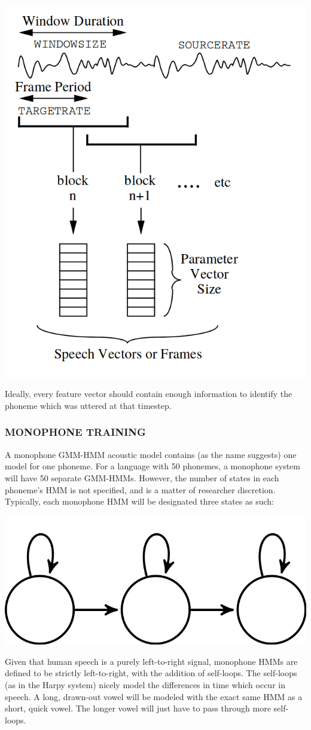\documentclass[10pt,a4paper]{article}
\begin{document}
  
\begin{center}
\includegraphics[width=.45\textwidth,keepaspectratio]{figs/htk-feats.png}
\end{center}

Ideally, every feature vector should contain enough information to identify the phoneme which was uttered at that timestep.


\subsubsection*{MONOPHONE TRAINING}

  A monophone GMM-HMM acoustic model contains (as the name suggests) one model for one phoneme. For a language with 50 phonemes, a monophone system will have 50 separate GMM-HMMs. However, the number of states in each phoneme's HMM is not specified, and is a matter of researcher discretion. Typically, each monophone HMM will be designated three states as such:

\begin{center}
\includegraphics[width=.45\textwidth,keepaspectratio]{figs/3-state-hmm.png}
\end{center}

Given that human speech is a purely left-to-right signal, monophone HMMs are defined to be strictly left-to-right, with the addition of self-loops. The self-loops (as in the Harpy system) nicely model the differences in time which occur in speech. A long, drawn-out vowel will be modeled with the exact same HMM as a short, quick vowel. The longer vowel will just have to pass through more self-loops.
\end{document}
